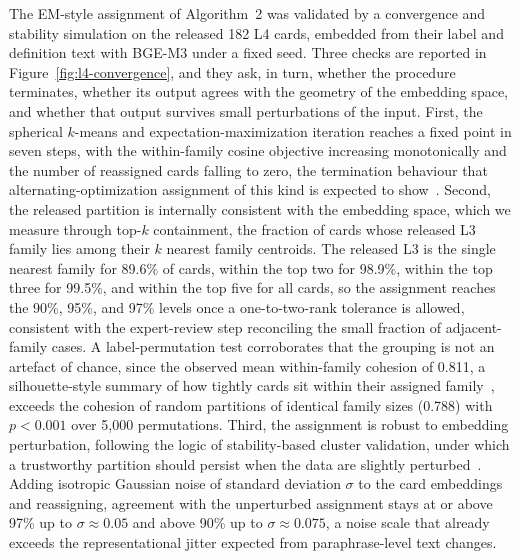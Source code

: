 \documentclass[11pt]{article}
\begin{document}
The EM-style assignment of Algorithm~2 was validated by a convergence and stability simulation on the released 182 L4 cards, embedded from their label and definition text with BGE-M3 under a fixed seed. Three checks are reported in Figure~\ref{fig:l4-convergence}, and they ask, in turn, whether the procedure terminates, whether its output agrees with the geometry of the embedding space, and whether that output survives small perturbations of the input. First, the spherical \(k\)-means and expectation-maximization iteration reaches a fixed point in seven steps, with the within-family cosine objective increasing monotonically and the number of reassigned cards falling to zero, the termination behaviour that alternating-optimization assignment of this kind is expected to show~\cite{dhillon2001,dempster1977}. Second, the released partition is internally consistent with the embedding space, which we measure through top-\(k\) containment, the fraction of cards whose released L3 family lies among their \(k\) nearest family centroids. The released L3 is the single nearest family for 89.6\% of cards, within the top two for 98.9\%, within the top three for 99.5\%, and within the top five for all cards, so the assignment reaches the 90\%, 95\%, and 97\% levels once a one-to-two-rank tolerance is allowed, consistent with the expert-review step reconciling the small fraction of adjacent-family cases. A label-permutation test corroborates that the grouping is not an artefact of chance, since the observed mean within-family cohesion of 0.811, a silhouette-style summary of how tightly cards sit within their assigned family~\cite{rousseeuw1987}, exceeds the cohesion of random partitions of identical family sizes (0.788) with \(p<0.001\) over 5{,}000 permutations. Third, the assignment is robust to embedding perturbation, following the logic of stability-based cluster validation, under which a trustworthy partition should persist when the data are slightly perturbed~\cite{vonluxburg2010}. Adding isotropic Gaussian noise of standard deviation \(\sigma\) to the card embeddings and reassigning, agreement with the unperturbed assignment stays at or above 97\% up to \(\sigma\approx0.05\) and above 90\% up to \(\sigma\approx0.075\), a noise scale that already exceeds the representational jitter expected from paraphrase-level text changes.
\end{document}
